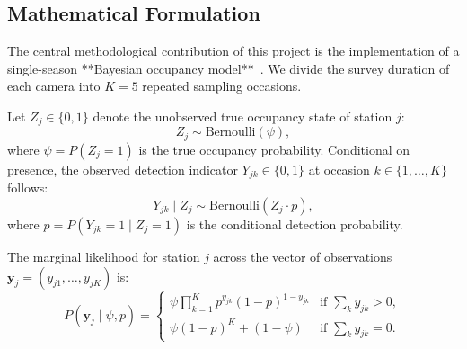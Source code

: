 \documentclass[11pt,a4paper]{article}
\begin{document}
\subsection{Mathematical Formulation}
The central methodological contribution of this project is the implementation of a single-season **Bayesian occupancy model**~\cite{mackenzie2002}. We divide the survey duration of each camera into $K = 5$ repeated sampling occasions. 

Let $Z_j \in \{0, 1\}$ denote the unobserved true occupancy state of station $j$:
\begin{equation}
Z_j \sim \text{Bernoulli}(\psi),
\end{equation}
where $\psi = P(Z_j = 1)$ is the true occupancy probability. Conditional on presence, the observed detection indicator $Y_{jk} \in \{0, 1\}$ at occasion $k \in \{1, \dots, K\}$ follows:
\begin{equation}
Y_{jk} \mid Z_j \sim \text{Bernoulli}(Z_j \cdot p),
\end{equation}
where $p = P(Y_{jk} = 1 \mid Z_j = 1)$ is the conditional detection probability.

The marginal likelihood for station $j$ across the vector of observations $\mathbf{y}_j = (y_{j1}, \dots, y_{jK})$ is:
\begin{equation}
P(\mathbf{y}_j \mid \psi, p) = \begin{cases}
\psi \prod_{k=1}^K p^{y_{jk}} (1-p)^{1 - y_{jk}} & \text{if } \sum_k y_{jk} > 0, \\
\psi (1-p)^K + (1 - \psi) & \text{if } \sum_k y_{jk} = 0.
\end{cases}
\end{equation}
\end{document}

